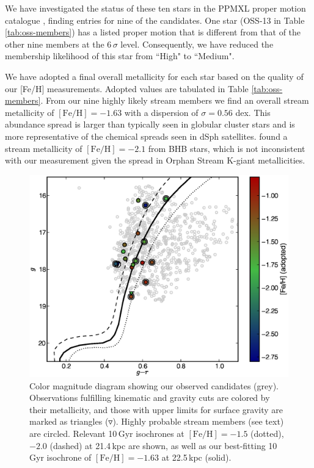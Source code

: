 \documentclass[10pt,apjl]{emulateapj}
\begin{document}
We have investigated the status of these ten stars in the PPMXL proper motion catalogue \citep{Roeser_et-al_2010}, finding entries for nine of the candidates. One star (OSS-13 in Table \ref{tab:oss-members}) has a listed proper motion that is different from that of the other nine members at the $6\,\sigma$ level. Consequently, we have reduced the membership likelihood of this star from ``High" to ``Medium".

We have adopted a final overall metallicity for each star based on the quality of our [Fe/H] measurements. Adopted values are tabulated in Table \ref{tab:oss-members}. From our nine highly likely stream members we find an overall stream metallicity of $[\mbox{Fe/H}] = -1.63$ with a dispersion of $\sigma = 0.56$ dex. This abundance spread is larger than typically seen in globular cluster stars and is more representative of the chemical spreads seen in dSph satellites. \citet{Newberg_et-al_2010} found a stream metallicity of $[\mbox{Fe/H}] = -2.1$ from BHB stars, which is not inconsistent with our measurement given the spread in Orphan Stream K-giant metallicities.

\begin{figure}[h!]
	\includegraphics[width=\columnwidth]{./fig4.eps}
	\caption{Color magnitude diagram showing our observed candidates (grey). Observations fulfilling kinematic and gravity cuts are colored by their metallicity, and those with upper limits for surface gravity are marked as triangles ($\triangledown$). Highly probable stream members (see text) are circled. Relevant 10\,Gyr \citet{Girardi_et-al_2008} isochrones at $[\mbox{Fe/H}] = -1.5$ (dotted), $-2.0$ (dashed) at 21.4\,kpc \citep{Newberg_et-al_2010} are shown, as well as our best-fitting 10\,Gyr isochrone of $[\mbox{Fe/H}] = -1.63$ at 22.5\,kpc (solid).}
	\label{fig:cmd}
\end{figure}
\end{document}
